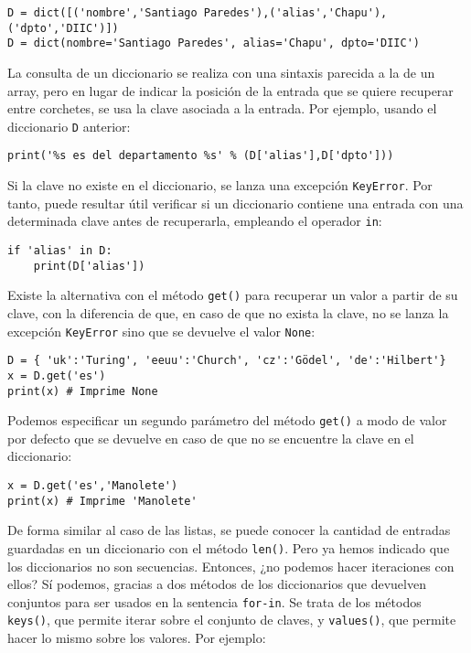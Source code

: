 \begin{lstlisting}
D = dict([('nombre','Santiago Paredes'),('alias','Chapu'),('dpto','DIIC')])
D = dict(nombre='Santiago Paredes', alias='Chapu', dpto='DIIC')
\end{lstlisting}

La consulta de un diccionario se realiza con una sintaxis parecida a la de un array, pero en lugar de indicar la posición de la entrada que se quiere recuperar entre corchetes, se usa la clave asociada a la entrada. Por ejemplo, usando el diccionario \texttt{D} anterior:

\begin{lstlisting}
print('%s es del departamento %s' % (D['alias'],D['dpto']))
\end{lstlisting}

Si la clave no existe en el diccionario, se lanza una excepción \texttt{KeyError}. Por tanto, puede resultar útil verificar si un diccionario contiene una entrada con una determinada clave antes de recuperarla, empleando el operador \texttt{in}:

\begin{lstlisting}
if 'alias' in D:
    print(D['alias'])
\end{lstlisting}

Existe la alternativa con el método \texttt{get()} para recuperar un valor a partir de su clave, con la diferencia de que, en caso de que no exista la clave, no se lanza la excepción \texttt{KeyError} sino que se devuelve el valor \texttt{None}:

\begin{lstlisting}
D = { 'uk':'Turing', 'eeuu':'Church', 'cz':'Gödel', 'de':'Hilbert'}
x = D.get('es')
print(x) # Imprime None
\end{lstlisting}

Podemos especificar un segundo parámetro del método \texttt{get()} a modo de valor por defecto que se devuelve en caso de que no se encuentre la clave en el diccionario:

\begin{lstlisting}
x = D.get('es','Manolete')
print(x) # Imprime 'Manolete'
\end{lstlisting}

De forma similar al caso de las listas, se puede conocer la cantidad de entradas guardadas en un diccionario con el método \texttt{len()}. Pero ya hemos indicado que los diccionarios no son secuencias. Entonces, ¿no podemos hacer iteraciones con ellos? Sí podemos, gracias a dos métodos de los diccionarios que devuelven conjuntos para ser usados en la sentencia \texttt{for-in}. Se trata de los métodos \texttt{keys()}, que permite iterar sobre el conjunto de claves, y \texttt{values()}, que permite hacer lo mismo sobre los valores. Por ejemplo:

